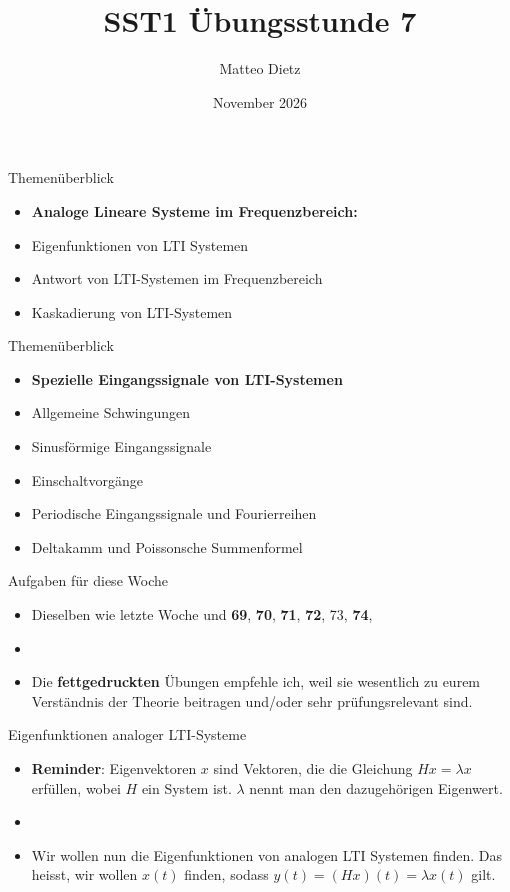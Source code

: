 \documentclass[14pt, aspectratio=169, handout]{beamer}
\title{SST1 Übungsstunde 7}
\author{Matteo Dietz}
\date{November 2026}
\begin{document}
\maketitle

\begin{frame}{Themenüberblick}
    \begin{itemize}
        \item \textbf{Analoge Lineare Systeme im Frequenzbereich:}
        \item[] Eigenfunktionen von LTI Systemen
        \item[] Antwort von LTI-Systemen im Frequenzbereich
        \item[] Kaskadierung von LTI-Systemen
    \end{itemize}
\end{frame}

\begin{frame}{Themenüberblick}
    \begin{itemize}
        \item \textbf{Spezielle Eingangssignale von LTI-Systemen}
        \item[] Allgemeine Schwingungen
        \item[] Sinusförmige Eingangssignale 
        \item[] Einschaltvorgänge
        \item[] Periodische Eingangssignale und Fourierreihen
        \item[] Deltakamm und Poissonsche Summenformel
    \end{itemize}
\end{frame}

\begin{frame}{Aufgaben für diese Woche}
    \begin{itemize}
        \item[] Dieselben wie letzte Woche und \textbf{69}, \textbf{70}, \textbf{71}, \textbf{72}, 73, \textbf{74}, 
        \item[] 
        \item[] Die \textbf{fettgedruckten} Übungen empfehle ich, weil sie wesentlich zu eurem Verständnis der Theorie beitragen und/oder sehr prüfungsrelevant sind.
    \end{itemize}
\end{frame}

\begin{frame}{Eigenfunktionen analoger LTI-Systeme}
    \begin{itemize}
        \item \textbf{Reminder}: Eigenvektoren $x$ sind Vektoren, die die Gleichung $Hx = \lambda x$ erfüllen, wobei $H$ ein System ist. $\lambda$ nennt man den dazugehörigen Eigenwert.
        \item[] 
        \item Wir wollen nun die Eigenfunktionen von analogen LTI Systemen finden. Das heisst, wir wollen $x(t)$ finden, sodass $y(t) = (Hx)(t) = \lambda x(t)$ gilt.
    \end{itemize}
\end{frame}
\end{document}

